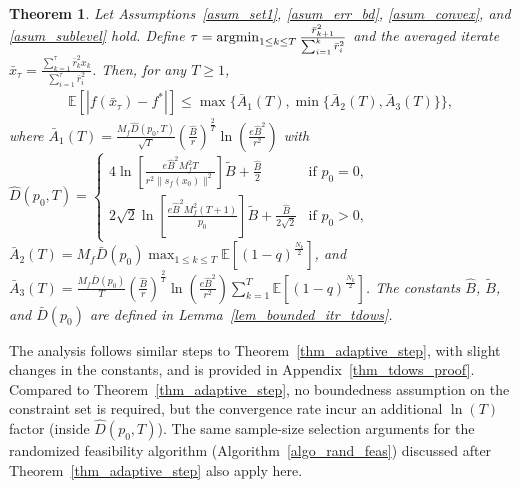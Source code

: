 \documentclass{article}
\newcommand{\EXP}[1]
{\mathbb{E}\!\left[#1\right] }
\def\argmin{\mathop{\rm argmin}}
\newcommand{\colr}[1]{\textcolor{red}{#1}} %
\theoremstyle{plain}
\newtheorem{theorem}{Theorem}[section]
\theoremstyle{definition}
\theoremstyle{remark}
\begin{document}
\begin{theorem}\label{thm_tdows}
    Let Assumptions~\ref{asum_set1}, \ref{asum_err_bd}, \ref{asum_convex}, and \ref{asum_sublevel} hold. Define $\tau = \argmin_{1 \leq k \leq T} \frac{\bar r_{k+1}^2}{\sum_{i=1}^k \bar r_i^2}$ and the averaged iterate $\bar x_\tau = \frac{\sum_{k=1}^\tau \bar r_k^2 x_k} {\sum_{i=1}^\tau \bar r_i^2}$. Then, for any $T \geq 1$,
    \begin{align*}
        \EXP{|f(\bar x_\tau) - f^*|} \leq \max \{\bar A_1(T), \min \{\bar A_2(T), \bar A_3(T)\}\} ,
    \end{align*}
    where $\bar A_1(T) = \frac{M_f \widehat D(p_0,T)}{\sqrt{T}} \left( \frac{\widehat B}{r} \right)^{\frac{2}{T}} \ln \left( \frac{e \widehat B^2}{r^2} \right)$ with $\widehat D(p_0,T) = \begin{cases}
         4 \ln \left[ \frac{e \widehat B^2 M_f^2 T}{r^2 \|s_f(x_0)\|^2} \right] \widetilde B + \frac{\widehat B}{2}  &\text{if $p_0 = 0$,} \\
         2 \sqrt{2} \ln \left[ \frac{e \widehat B^2 M_f^2 (T+1)}{p_0} \right] \widetilde B + \frac{\widehat B}{2\sqrt{2}}  &\text{if $p_0 > 0$,}
     \end{cases}$ $\bar A_2(T) = M_f \bar D(p_0) \max_{1 \leq k \leq T} \EXP{(1-q)^{\frac{N_{k}}{2}}}$, and $\bar A_3(T) = \frac{M_f \bar D(p_0)}{T} \left( \frac{\widehat B}{r} \right)^{\frac{2}{T}} \ln \left( \frac{e \widehat B^2}{r^2} \right) \sum_{k=1}^T \EXP{(1-q)^{\frac{N_{k}}{2}}}$. The constants $\widehat B$, $\widetilde B$, and $\bar D(p_0)$ are defined in Lemma~\ref{lem_bounded_itr_tdows}.
\end{theorem}
%
%
The analysis follows similar steps to Theorem~\ref{thm_adaptive_step}, with slight changes in the constants, and is provided in Appendix~\ref{thm_tdows_proof}. Compared to Theorem~\ref{thm_adaptive_step}, no boundedness assumption on the constraint set is required, but the convergence rate incur an additional $\ln(T)$ factor (inside $\widehat D(p_0,T)$). The same sample-size selection arguments for the randomized feasibility algorithm (Algorithm~\ref{algo_rand_feas}) discussed after Theorem~\ref{thm_adaptive_step} also apply here.





\end{document}
